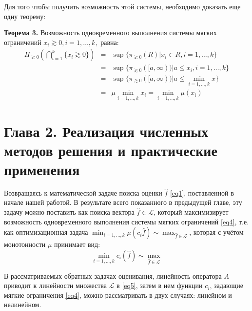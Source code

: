 \documentclass[12pt, a4paper, oneside]{article}
\begin{document}
			Для того чтобы получить возможность этой системы, необходимо доказать еще одну теорему:
			
			\textbf{Теорема 3.} Возможность одновременного выполнения системы мягких ограничений $x_i\gtrsim 0, i=1,\dots,k,$ равна:
			\begin{eqnarray}
				\Pi_{\gtrsim 0}(\bigcap_{i=1}^k \{x_i\gtrsim 0\}) &=& \sup\{\pi_{\gtrsim 0}(R) | x_i\in R, i = 1,\dots,k\}	\nonumber \\
																  &=& \sup\{\pi_{\gtrsim 0}([a,\infty)) | a\le x_i, i =1,\dots,k\} \nonumber \\
																  &=& \sup\{\pi_{\gtrsim 0}([a,\infty)) | a\le \min_{i=1,\dots,k} x\} \nonumber \\
																  &=& \mu \min_{i=1,\dots,k} x_i = \min_{i=1,\dots,k} \mu(x_i) \nonumber
			\end{eqnarray}
		
	\section{Глава 2. Реализация численных методов решения и практические применения}
		Возвращаясь к математической задаче поиска оценки $\hat{f}$ \eqref{eq1}, поставленной в начале нашей работой. В результате всего показанного в предыдущей главе, эту задачу можно поставить как поиска вектора $\hat{f}\in \mathcal{L}$, который максимизирует возможность одновременного выполнения системы мягких ограничений \eqref{eq4}, т.е. как оптимизационная задача $\min_{i=1,\dots,k}\mu(c_i\hat{f}) \sim \max_{\hat{f}\in\mathcal{L}}$, которая с учётом монотонности $\mu$ принимает вид:
			\begin{equation}
				\label{eq5}
				\min_{i=1,\dots,k}c_i(\hat{f}) \sim \max_{\hat{f}\in\mathcal{L}}
			\end{equation}
		
		В рассматриваемых обратных задачах оценивания, линейность оператора $A$ приводит к линейности множества $\mathcal{L}$ в \eqref{eq5}, затем в нем функции  $c_i$, задающие мягкие ограничения \eqref{eq4}, можно рассматривать в двух случаях: линейном и нелинейном.
			
\end{document}
